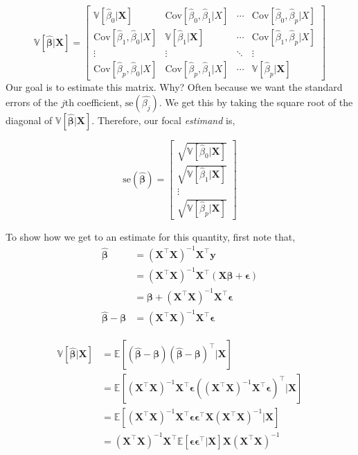 \documentclass[]{article}
\begin{document}
\[
\mathbb{V}[\hat{\bm{\beta}}|\mathbf{X}] = 
\begin{bmatrix}
\mathbb{V}[\hat{\beta}_0|\mathbf{X}] & \text{Cov}[\hat{\beta}_0, \hat{\beta}_1|X] & \cdots & \text{Cov}[\hat{\beta}_0, \hat{\beta}_p|X] \\
\text{Cov}[\hat{\beta}_1, \hat{\beta}_0|X] & \mathbb{V}[\hat{\beta}_1|\mathbf{X}] & \cdots & \text{Cov}[\hat{\beta}_1, \hat{\beta}_p|X] \\
\vdots & \vdots & \ddots & \vdots \\
\text{Cov}[\hat{\beta}_p, \hat{\beta}_0|X] & \text{Cov}[\hat{\beta}_p, \hat{\beta}_1|X] & \cdots & \mathbb{V}[\hat{\beta}_p|\mathbf{X}]
\end{bmatrix}
\] Our goal is to estimate this matrix. Why? Often because we want the
standard errors of the \(j\)th coefficient,
\(\text{se}(\hat{\beta_j})\). We get this by taking the square root of
the diagonal of \(\mathbb{V}[\hat{\bm{\beta}}|\mathbf{X}]\). Therefore,
our focal \emph{estimand} is,

\[
\text{se}(\hat{\bm{\beta}}) = \begin{bmatrix} \sqrt{\mathbb{V}[\hat{\beta}_0|\mathbf{X}]} \\ \sqrt{\mathbb{V}[\hat{\beta}_1|\mathbf{X}]} \\ \vdots \\ \sqrt{\mathbb{V}[\hat{\beta}_p|\mathbf{X}]} \end{bmatrix}
\]

To show how we get to an estimate for this quantity, first note that, \[
\begin{aligned}
\hat{\bm{\beta}} &= (\mathbf{X}^\top \mathbf{X})^{-1} \mathbf{X}^\top \mathbf{y}\\
&= (\mathbf{X}^\top \mathbf{X})^{-1} \mathbf{X}^\top (\mathbf{X}\bm{\beta}+ \bm{\epsilon}) \\
&= \bm{\beta}+ (\mathbf{X}^\top \mathbf{X})^{-1} \mathbf{X}^\top \bm{\epsilon}\\
\hat{\bm{\beta}} - \bm{\beta}&= (\mathbf{X}^\top \mathbf{X})^{-1} \mathbf{X}^\top \bm{\epsilon}
\end{aligned}
\]

\[
\begin{aligned}
\mathbb{V}[\hat{\bm{\beta}}|\mathbf{X}] &= \mathbb{E}[(\hat{\bm{\beta}} - \bm{\beta}) (\hat{\bm{\beta}} - \bm{\beta})^\top|\mathbf{X}] \\
&= \mathbb{E}[(\mathbf{X}^\top \mathbf{X})^{-1} \mathbf{X}^\top \bm{\epsilon}((\mathbf{X}^\top \mathbf{X})^{-1} \mathbf{X}^\top \bm{\epsilon})^\top |\mathbf{X}] \\
&= \mathbb{E}[(\mathbf{X}^\top \mathbf{X})^{-1} \mathbf{X}^\top \bm{\epsilon}\bm{\epsilon}^\top \mathbf{X}(\mathbf{X}^\top \mathbf{X})^{-1}  |\mathbf{X}] \\
&= (\mathbf{X}^\top \mathbf{X})^{-1} \mathbf{X}^\top \mathbb{E}[\bm{\epsilon}\bm{\epsilon}^\top |\mathbf{X}] \mathbf{X}(\mathbf{X}^\top \mathbf{X})^{-1}
\end{aligned}
\]
\end{document}
